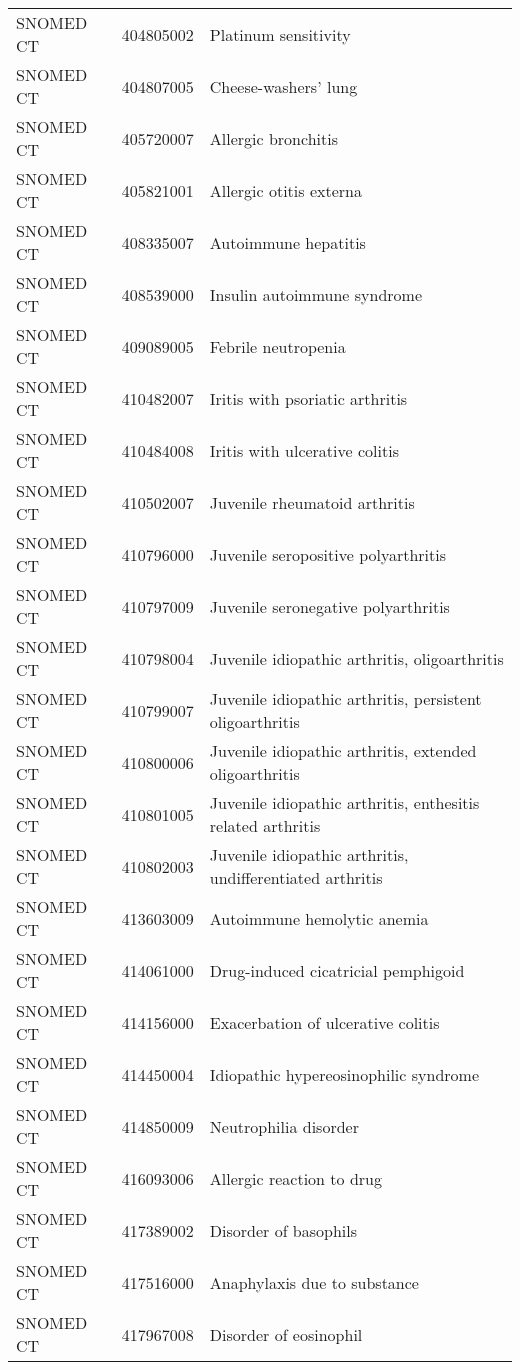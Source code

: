\begin{longtable}{p{}p{}p{}}
  SNOMED CT & 404805002 & Platinum sensitivity \\ 
  SNOMED CT & 404807005 & Cheese-washers' lung \\ 
  SNOMED CT & 405720007 & Allergic bronchitis \\ 
  SNOMED CT & 405821001 & Allergic otitis externa \\ 
  SNOMED CT & 408335007 & Autoimmune hepatitis \\ 
  SNOMED CT & 408539000 & Insulin autoimmune syndrome \\ 
  SNOMED CT & 409089005 & Febrile neutropenia \\ 
  SNOMED CT & 410482007 & Iritis with psoriatic arthritis \\ 
  SNOMED CT & 410484008 & Iritis with ulcerative colitis \\ 
  SNOMED CT & 410502007 & Juvenile rheumatoid arthritis \\ 
  SNOMED CT & 410796000 & Juvenile seropositive polyarthritis \\ 
  SNOMED CT & 410797009 & Juvenile seronegative polyarthritis \\ 
  SNOMED CT & 410798004 & Juvenile idiopathic arthritis, oligoarthritis \\ 
  SNOMED CT & 410799007 & Juvenile idiopathic arthritis, persistent oligoarthritis \\ 
  SNOMED CT & 410800006 & Juvenile idiopathic arthritis, extended oligoarthritis \\ 
  SNOMED CT & 410801005 & Juvenile idiopathic arthritis, enthesitis related arthritis \\ 
  SNOMED CT & 410802003 & Juvenile idiopathic arthritis, undifferentiated arthritis \\ 
  SNOMED CT & 413603009 & Autoimmune hemolytic anemia \\ 
  SNOMED CT & 414061000 & Drug-induced cicatricial pemphigoid \\ 
  SNOMED CT & 414156000 & Exacerbation of ulcerative colitis \\ 
  SNOMED CT & 414450004 & Idiopathic hypereosinophilic syndrome \\ 
  SNOMED CT & 414850009 & Neutrophilia disorder \\ 
  SNOMED CT & 416093006 & Allergic reaction to drug \\ 
  SNOMED CT & 417389002 & Disorder of basophils \\ 
  SNOMED CT & 417516000 & Anaphylaxis due to substance \\ 
  SNOMED CT & 417967008 & Disorder of eosinophil \\ 

\end{longtable}

